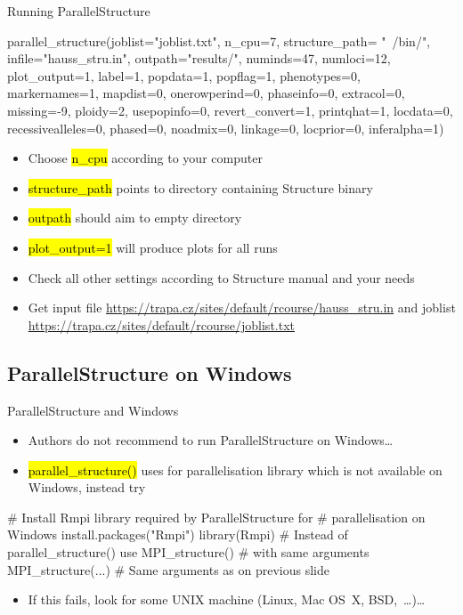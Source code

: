 \documentclass[compress, ucs, xelatex, 11pt, xcolor=svgnames,
  hyperref={
    bookmarks=true,
    unicode=true,
    colorlinks=true,
    pdftitle={Molecular data in R},
    plainpages=false,
    pdfauthor={Vojtech Zeisek},
    pdfsubject={Course about phylogeny and evolution in R},
    pdfcreator={XeLaTeX},
    pdfkeywords={R, evolution, phylogeny, molecular data},
    linkcolor=Tomato,
    anchorcolor=SaddleBrown,
    citecolor=Goldenrod,
    filecolor=DarkMagenta,
    menucolor=Sienna,
    urlcolor=DarkTurquoise,
    pdftex},
  url={hyphens, lowtilde} %
  ]{beamer}
\renewcommand{\texttt}[1]{\hl{\ttfamily #1}}
\begin{document}
\begin{frame}[fragile]{Running ParallelStructure}
  \begin{spluscode}
    parallel_structure(joblist="joblist.txt", n_cpu=7, structure_path=
      "~/bin/", infile="hauss_stru.in", outpath="results/", numinds=47,
      numloci=12, plot_output=1, label=1, popdata=1, popflag=1,
      phenotypes=0, markernames=1, mapdist=0, onerowperind=0, phaseinfo=0,
      extracol=0, missing=-9, ploidy=2, usepopinfo=0, revert_convert=1,
      printqhat=1, locdata=0, recessivealleles=0, phased=0, noadmix=0,
      linkage=0, locprior=0, inferalpha=1)
  \end{spluscode}
\begin{itemize}
 \item Choose \texttt{n\_cpu} according to your computer
 \item \texttt{structure\_path} points to \alert{directory} containing Structure binary
 \item \texttt{outpath} should aim to \alert{empty} directory
 \item \texttt{plot\_output=1} will produce plots for all runs
 \item Check all other settings according to Structure manual and your needs
 \item Get input file \url{https://trapa.cz/sites/default/rcourse/hauss_stru.in} and joblist \url{https://trapa.cz/sites/default/rcourse/joblist.txt}
\end{itemize}
\end{frame}

\subsection{ParallelStructure on Windows}

\begin{frame}[fragile]{ParallelStructure and Windows}
\begin{itemize}
 \item Authors do not recommend to run ParallelStructure on Windows\ldots
 \item \texttt{parallel\_structure()} uses for parallelisation library which is not available on Windows, instead try
\end{itemize}
  \begin{spluscode}
    # Install Rmpi library required by ParallelStructure for
    # parallelisation on Windows
    install.packages("Rmpi")
    library(Rmpi)
    # Instead of parallel_structure() use MPI_structure()
    # with same arguments
    MPI_structure(...) # Same arguments as on previous slide
  \end{spluscode}
\begin{itemize}
 \item If this fails, look for some UNIX machine (Linux, Mac OS~X, BSD,~\ldots)\ldots
\end{itemize}
\end{frame}
\end{document}
